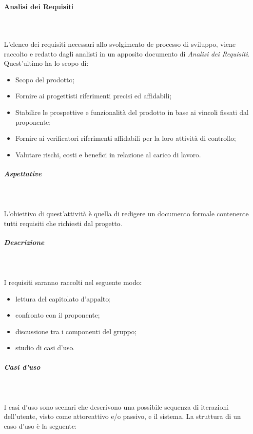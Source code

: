 			\paragraph{Analisi dei Requisiti} \mbox{} \\ \mbox{} \\
			L'elenco dei requisiti necessari allo svolgimento de processo di sviluppo, viene raccolto e redatto dagli analisti in un apposito documento di \textit{Analisi dei Requisiti}. Quest'ultimo ha lo scopo di:
				\begin{itemize}
					\item Scopo del prodotto;
					\item Fornire ai progettisti riferimenti precisi ed affidabili;
					\item Stabilire le prospettive e funzionalità del prodotto in base ai vincoli fissati dal proponente;
					\item Fornire ai verificatori riferimenti affidabili per la loro attività di controllo;
					\item Valutare rischi, costi e benefici in relazione al carico di lavoro.
				\end{itemize} 
			\subparagraph*{Aspettative} \mbox{} \\ \mbox{} \\
			L'obiettivo di quest'attività è quella di redigere un documento formale contenente tutti requisiti che richiesti dal progetto.
			\subparagraph*{Descrizione} \mbox{} \\ \mbox{} \\
			I requisiti saranno raccolti nel seguente modo:
				\begin{itemize} 
					\item lettura del capitolato d'appalto;
					\item confronto con il proponente;
					\item discussione tra i componenti del gruppo;
					\item studio di casi d'uso.
				\end{itemize}
				\subparagraph*{Casi d'uso} \mbox{} \\ \mbox{} \\
				I casi d'uso sono scenari che descrivono una possibile sequenza di iterazioni dell'utente, visto come attore\glo attivo e/o passivo, e il sistema. La struttura di un caso d'uso è la seguente:
